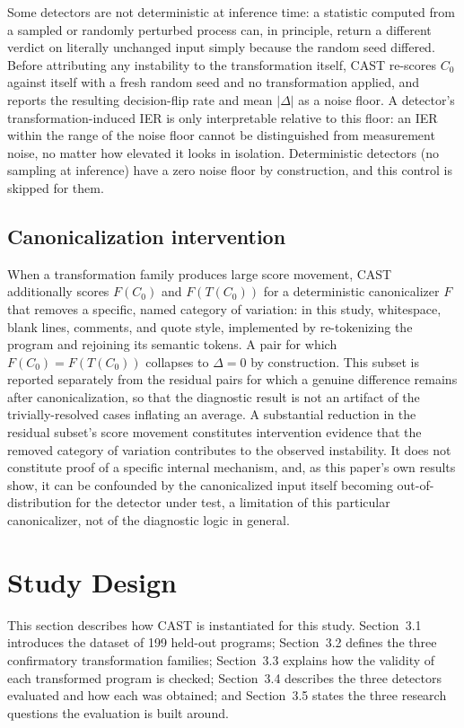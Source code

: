 \documentclass[sigconf,review,anonymous]{acmart}
\begin{document}
Some detectors are not deterministic at inference time: a statistic computed from a sampled or randomly perturbed process can, in principle, return a different verdict on literally unchanged input simply because the random seed differed. Before attributing any instability to the transformation itself, CAST re-scores $C_0$ against itself with a fresh random seed and no transformation applied, and reports the resulting decision-flip rate and mean $|\Delta|$ as a noise floor. A detector's transformation-induced IER is only interpretable relative to this floor: an IER within the range of the noise floor cannot be distinguished from measurement noise, no matter how elevated it looks in isolation. Deterministic detectors (no sampling at inference) have a zero noise floor by construction, and this control is skipped for them.

\subsection{Canonicalization intervention}
\label{sec:canon}

When a transformation family produces large score movement, CAST additionally scores $F(C_0)$ and $F(T(C_0))$ for a deterministic canonicalizer $F$ that removes a specific, named category of variation: in this study, whitespace, blank lines, comments, and quote style, implemented by re-tokenizing the program and rejoining its semantic tokens. A pair for which $F(C_0) = F(T(C_0))$ collapses to $\Delta = 0$ by construction. This subset is reported separately from the residual pairs for which a genuine difference remains after canonicalization, so that the diagnostic result is not an artifact of the trivially-resolved cases inflating an average. A substantial reduction in the residual subset's score movement constitutes intervention evidence that the removed category of variation contributes to the observed instability. It does not constitute proof of a specific internal mechanism, and, as this paper's own results show, it can be confounded by the canonicalized input itself becoming out-of-distribution for the detector under test, a limitation of this particular canonicalizer, not of the diagnostic logic in general.

\section{Study Design}

This section describes how CAST is instantiated for this study. Section~3.1 introduces the dataset of 199 held-out programs; Section~3.2 defines the three confirmatory transformation families; Section~3.3 explains how the validity of each transformed program is checked; Section~3.4 describes the three detectors evaluated and how each was obtained; and Section~3.5 states the three research questions the evaluation is built around.
\end{document}
